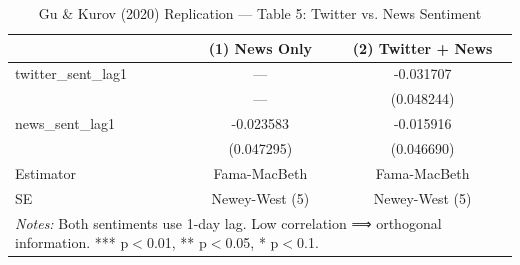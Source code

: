 \begin{table}[htbp]
\centering
\caption{Gu \& Kurov (2020) Replication --- Table 5: Twitter vs. News Sentiment}
\label{tab:gk_t5}
\begin{tabular}{lcc}
\hline\hline
 & (1) News Only & (2) Twitter + News \\
\hline
twitter\_sent\_lag1 & --- & -0.031707 \\
& --- & (0.048244) \\
news\_sent\_lag1 & -0.023583 & -0.015916 \\
& (0.047295) & (0.046690) \\
\hline
Estimator & Fama-MacBeth & Fama-MacBeth \\
SE & Newey-West (5) & Newey-West (5) \\
\hline\hline
\multicolumn{3}{l}{\footnotesize \textit{Notes:} Both sentiments use 1-day lag. Low correlation ⟹ orthogonal information. *** p$<$0.01, ** p$<$0.05, * p$<$0.1.} \\
\end{tabular}
\end{table}